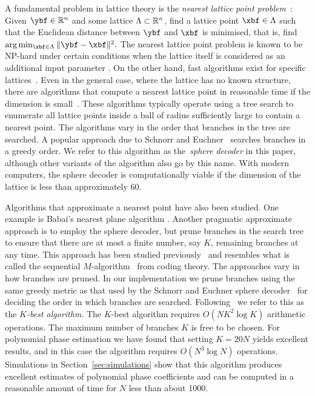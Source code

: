 \documentclass[journal]{IEEEtran}
\begin{document}
A fundamental problem in lattice theory is the \emph{nearest lattice point problem}~\cite{Agrell2002}: Given $\ybf\in\reals^n$ and some lattice $\Lambda \subset {\mathbb R}^n$, find a lattice point $\xbf \in \Lambda$ such that the Euclidean distance between $\ybf$ and $\xbf$ is minimised, that is, find $\arg\min_{\xbf \in \Lambda} \|\ybf - \xbf\|^2.$  The nearest lattice point problem is known to be NP-hard under certain conditions when the lattice itself is considered as an additional input parameter \cite{micciancio_hardness_2001}.  On the other hand, fast algorithms exist for specific lattices~\cite{SPLAG,Conway1982FastQuantDec,McKilliam2009CoxeterLattices,McKilliam2008}.  Even in the general case, where the lattice has no known structure, there are algorithms that compute a nearest lattice point in reasonable time if the dimension is small~\cite{Agrell2002, Viterbo_sphere_decoder_1999, Pohst_sphere_decoder_1981}. These algorithms typically operate using a tree search to enumerate all lattice points inside a ball of radius sufficiently large to contain a nearest point.  The algorithms vary in the order that branches in the tree are searched.  A popular approach due to Schnorr and Euchner~\cite{schnorr_euchner_sd_1994,Agrell2002} searches branches in a greedy order.  We refer to this algorithm as the~\emph{sphere decoder} in this paper, although other variants of the algorithm also go by this name.  With modern computers, the sphere decoder is computationally viable if the dimension of the lattice is less than approximately $60$.  

Algorithms that approximate a nearest point have also been studied.  One example is Babai's nearest plane algorithm \cite{Babai1986}.  Another pragmatic approximate approach is to employ the sphere decoder, but prune branches in the search tree to ensure that there are at most a finite number, say $K$, remaining branches at any time.  This approach has been studied previously~\cite{Baro_list_sphere_dec_2003,Zhan2006_K_best_sphere_decoder,Mondal_Kbest_again_2009} and resembles what is called the sequential $M$-algorithm~\citep{Anderson1984_seq_coding_alg} from coding theory.  The approaches vary in how branches are pruned.  In our implementation we prune branches using the same greedy metric as that used by the Schnorr and Euchner sphere decoder~\cite{schnorr_euchner_sd_1994,Agrell2002} for deciding the order in which branches are searched.  Following~\cite{Zhan2006_K_best_sphere_decoder} we refer to this as the \emph{$K$-best algorithm}.  The $K$-best algorithm requires $O(NK^2 \log K)$ arithmetic operations. The maximum number of branches $K$ is free to be chosen.  For polynomial phase estimation we have found that setting $K=20N$ yields excellent results, and in this case the algorithm requires $O(N^3 \log N)$ operations.  Simulations in Section~\ref{sec:simulations} show that this algorithm produces excellent estimates of polynomial phase coefficients and can be computed in a reasonable amount of time for $N$ less than about 1000.
\end{document}
